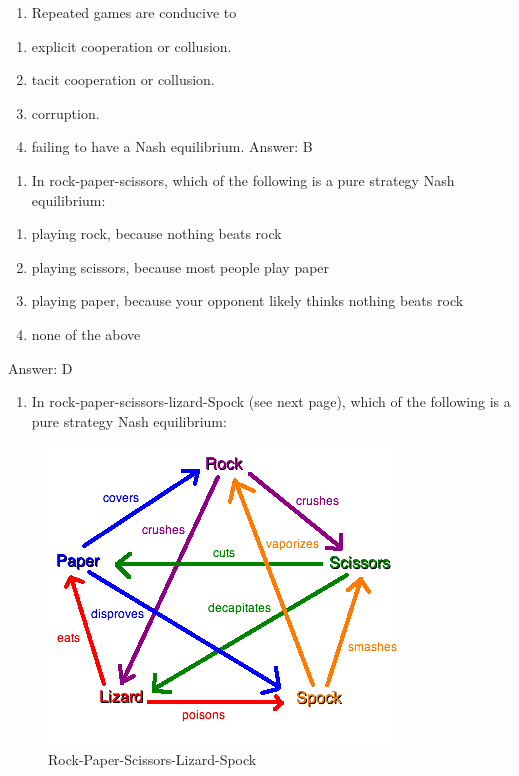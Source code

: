 \documentclass[11pt,]{article}
\providecommand{\tightlist}{%
  \setlength{\itemsep}{0pt}\setlength{\parskip}{0pt}}
\begin{document}
\begin{enumerate}
\def\labelenumi{\arabic{enumi})}
\setcounter{enumi}{23}
\tightlist
\item
  Repeated games are conducive to
\end{enumerate}

\begin{enumerate}
\def\labelenumi{\Alph{enumi})}
\tightlist
\item
  explicit cooperation or collusion.
\item
  tacit cooperation or collusion.
\item
  corruption.
\item
  failing to have a Nash equilibrium. Answer: B
\end{enumerate}

\begin{enumerate}
\def\labelenumi{\arabic{enumi})}
\setcounter{enumi}{24}
\tightlist
\item
  In rock-paper-scissors, which of the following is a pure strategy Nash
  equilibrium:
\end{enumerate}

\begin{enumerate}
\def\labelenumi{\Alph{enumi})}
\tightlist
\item
  playing rock, because nothing beats rock
\item
  playing scissors, because most people play paper
\item
  playing paper, because your opponent likely thinks nothing beats rock
\item
  none of the above
\end{enumerate}

Answer: D

\begin{enumerate}
\def\labelenumi{\arabic{enumi})}
\setcounter{enumi}{24}
\tightlist
\item
  In rock-paper-scissors-lizard-Spock (see next page), which of the
  following is a pure strategy Nash equilibrium:
\end{enumerate}

\begin{figure}
\centering
\includegraphics{Rock_paper_scissors_lizard_spock.png}
\caption{Rock-Paper-Scissors-Lizard-Spock}
\end{figure}
\end{document}
